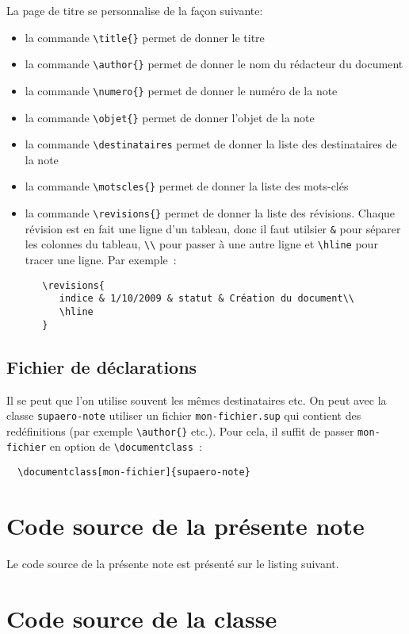\documentclass{supaero-note}
\begin{document}
La page de titre se personnalise de la façon suivante:

\begin{itemize}
\item la commande \verb!\title{}! permet de donner le titre
\item la commande \verb!\author{}! permet de donner le nom du
  rédacteur du document
\item la commande \verb!\numero{}! permet de donner le numéro de la
  note
\item la commande \verb!\objet{}! permet de donner l'objet de la note
\item la commande \verb!\destinataires! permet de donner la liste des
  destinataires de la note
\item la commande \verb!\motscles{}! permet de donner la liste des
  mots-clés
\item la commande \verb!\revisions{}! permet de donner la liste des
  révisions. Chaque révision est en fait une ligne d'un tableau, donc
  il faut utilsier \verb!&! pour séparer les colonnes du tableau,
  \verb!\\! pour passer à une autre ligne et \verb!\hline! pour tracer
  une ligne. Par exemple~:

\begin{verbatim}
   \revisions{
      indice & 1/10/2009 & statut & Création du document\\
      \hline
   } 
\end{verbatim}
\end{itemize}

\subsection{Fichier de déclarations}
\label{sec:fich-de-decl}

Il se peut que l'on utilise souvent les mêmes destinataires etc. On
peut avec la classe \texttt{supaero-note} utiliser un fichier
\texttt{mon-fichier.sup} qui contient des redéfinitions (par exemple
\verb!\author{}! etc.). Pour cela, il suffit de passer
\verb!mon-fichier! en option de \verb!\documentclass!~:

\begin{verbatim}
  \documentclass[mon-fichier]{supaero-note}
\end{verbatim}

\section{Code source de la présente note}
\label{sec:code-source}

Le code source de la présente note est présenté sur le listing
suivant.



\section{Code source de la classe}
\label{sec:code-source-supaero-note}





\end{document}

